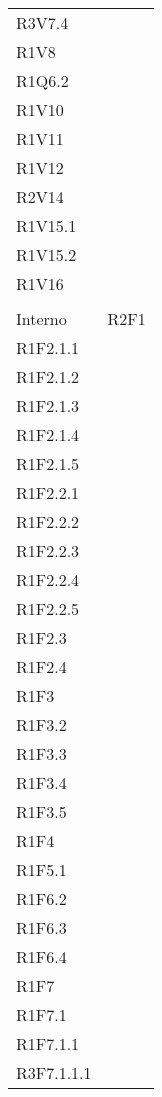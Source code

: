 \begin{longtable}{ >{\centering}p{}
			>{\centering}p{}}
R3V7.4\\
R1V8\\
R1Q6.2\\

R1V10\\
R1V11\\
R1V12\\
R2V14\\
R1V15.1\\
R1V15.2\\
R1V16\\
	\tabularnewline
Interno	&	 R2F1\\
R1F2.1.1\\
R1F2.1.2\\
R1F2.1.3\\
R1F2.1.4\\
R1F2.1.5\\
R1F2.2.1\\
R1F2.2.2\\
R1F2.2.3\\
R1F2.2.4\\
R1F2.2.5\\
R1F2.3\\
R1F2.4\\
R1F3\\
R1F3.2\\
R1F3.3\\
R1F3.4\\
R1F3.5\\
R1F4\\
R1F5.1\\
R1F6.2\\
R1F6.3\\
R1F6.4\\
R1F7\\
R1F7.1\\
R1F7.1.1\\
R3F7.1.1.1 \\


\end{longtable}
